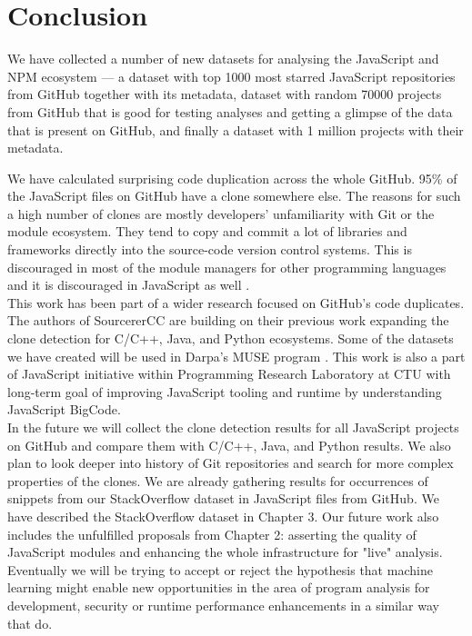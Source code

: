 \documentclass[thesis=M,english]{FITthesis}[2012/10/20]
\begin{document}
\chapter{Conclusion}

We have collected a number of new datasets for analysing the JavaScript and NPM ecosystem — a dataset with top 1000 most starred JavaScript repositories from GitHub together with its metadata, dataset with random 70000 projects from GitHub that is good for testing analyses and getting a glimpse of the data that is present on GitHub, and finally a dataset with 1 million projects with their metadata.

We have calculated surprising code duplication across the whole GitHub. 95\% of the JavaScript files on GitHub have a clone somewhere else. The reasons for such a high number of clones are mostly developers' unfamiliarity with Git or the module ecosystem. They tend to copy and commit a lot of libraries and frameworks directly into the source-code version control systems. This is discouraged in most of the module managers for other programming languages and it is discouraged in JavaScript as well \cite{gitignore}. \\

This work has been part of a wider research focused on GitHub's code duplicates. The authors of SourcererCC \cite{scc_1} are building on their previous work expanding the clone detection for C/C++, Java, and Python ecosystems. Some of the datasets we have created will be used in Darpa's MUSE program \cite{muse}. This work is also a part of JavaScript initiative within Programming Research Laboratory at CTU with long-term goal of improving JavaScript tooling and runtime by understanding JavaScript BigCode. \\

In the future we will collect the clone detection results for all JavaScript projects on GitHub and compare them with C/C++, Java, and Python results. We also plan to look deeper into history of Git repositories and search for more complex properties of the clones. We are already gathering results for occurrences of snippets from our StackOverflow dataset in JavaScript files from GitHub. We have described the StackOverflow dataset in Chapter 3. Our future work also includes the unfulfilled proposals from Chapter 2: asserting the quality of JavaScript modules and enhancing the whole infrastructure for "live" analysis. Eventually we will be trying to accept or reject the hypothesis that machine learning might enable new opportunities in the area of program analysis for development, security or runtime performance enhancements in a similar way that \cite{jsnice, muse_mit1, muse_mit2, muse_colo} do.
\end{document}
